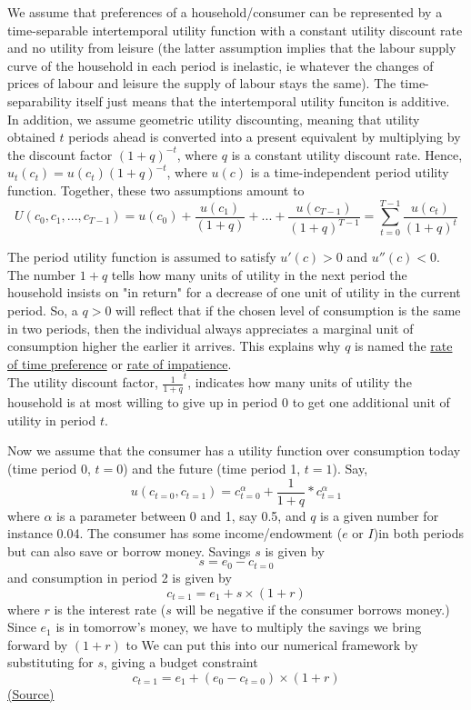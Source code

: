 \documentclass[a4paper, 12pt, reqno]{article}
\begin{document}
We assume that preferences of a household/consumer can be represented by a time-separable intertemporal utility function with a constant utility discount rate and no utility from 
leisure (the latter assumption implies that the labour supply curve of the household in each period is inelastic, ie whatever the changes of prices of labour and leisure the supply of labour stays the same). 
The time-separability itself just means that the intertemporal utility funciton is additive.  \\ 
In addition, we assume geometric utility discounting, meaning that utility obtained $t$ periods ahead is converted into a present equivalent by multiplying by the discount factor $(1 + q)^{-t}$, where $q$ 
is a constant utility discount rate. Hence, $u_t(c_t) = u(c_t)(1 + q)^{-t} $, where $u(c)$ is a time-independent period utility function. Together, these two assumptions amount to
$$ U(c_0, c_1, ..., c_{T-1}) = u(c_0) + \frac{u(c_1)}{(1+q)} + ... +  \frac{u(c_{T -1})}{(1+q)^{T-1}} = \sum_{t = 0}^{T - 1} \frac{u(c_{t})}{(1+q)^{t}} $$

The period utility function is assumed to satisfy $u'(c) > 0 $ and $u''(c) < 0 $.  \\ 
The number $ 1 + q$ tells how many units of utility in the next period the household insists on "in return" for a decrease of one unit of utility in the current period. 
So, a $q > 0$ will reflect that if the chosen level of consumption is the same in two periods, then the individual always appreciates a marginal unit of consumption higher the earlier it arrives. 
This explains why $q$ is named the \underline{rate of time preference} or \underline{rate of impatience}. \\ The utility discount factor, $\frac{1}{1+q}^t$, indicates how many units of utility the household is at most willing to give up 
in period 0 to get one additional unit of utility in period $t$.

Now we assume that the consumer has a utility function over consumption today (time period 0, $t = 0$) and the future (time period 1, $t = 1$). Say, 
$$ u(c_{t = 0},c_{t = 1}) = c_{t = 0}^{\alpha} + \frac{1}{1+q} * c_{t = 1}^{\alpha} $$ 
where $\alpha$ is a parameter between 0 and 1, say 0.5, and $q$ is a given number for instance 0.04. 
The consumer has some income/endowment ($e$ or $I$)in both periods but can also save or borrow money. Savings $s$ is given by 
$$ s = e_0 - c_{t = 0} $$ 
and consumption in period 2 is given by 
$$ c_{t = 1} = e_1 + s \times (1+r)$$ 
where $r$ is the interest rate ($s$ will be negative if the consumer borrows money.) Since $e_1$ is in tomorrow's money, we have to multiply the savings we bring forward by $(1 + r)$ to We can put this into our 
numerical framework by substituting for $s$, giving a budget constraint 
$$ c_{t = 1} = e_1+ (e_0- c_{t = 0}) \times (1+r)$$
\href{https://web.econ.ku.dk/okocg/VM/VM-general/Kapitler%20til%20bog/Ch9-2016-1.pdf}{(Source)} \\
\end{document}
